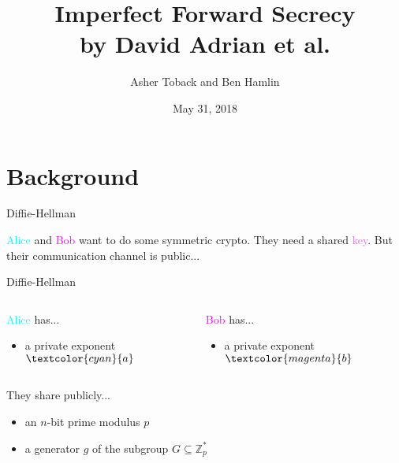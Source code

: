 \documentclass[presentation, aspectratio=54]{beamer}
\author{Asher Toback and Ben Hamlin}
\date{May 31, 2018}
\title{Imperfect Forward Secrecy \\ by David Adrian et al.}
\newcommand{\cyan}[1]{\textcolor{cyan}{#1}}
\newcommand{\magenta}[1]{\textcolor{magenta}{#1}}
\newcommand{\purple}[1]{\textcolor{orchid}{#1}}
\begin{document}
\maketitle
\section{Background}


\begin{frame}{Diffie-Hellman}

\cyan{Alice} and \magenta{Bob} want to do some symmetric crypto. They need a
shared \purple{key}. But their communication channel is public...

\end{frame}


\begin{frame}{Diffie-Hellman}

\begin{columns}
\begin{column}{0.5\textwidth}
\cyan{Alice} has...
\begin{itemize}
\item a private exponent $\cyan{a}$
\end{itemize}
\end{column}\hfill
\begin{column}{0.5\textwidth}
\magenta{Bob} has...
\begin{itemize}
\item a private exponent $\magenta{b}$
\end{itemize}
\end{column}
\end{columns}
\vspace{20pt}
They share publicly...
\begin{itemize}
\item an $n$-bit prime modulus $p$
\item a generator $g$ of the subgroup $G \subseteq \mathbb{Z}^*_p$
\end{itemize}

\end{frame}

\end{document}
